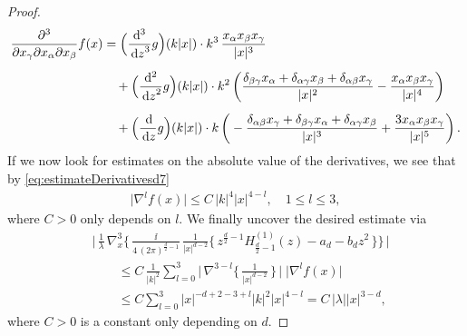 \begin{proof}
\begin{align*}
  \frac{\partial^3}{\partial x_\gamma \partial x_\alpha \partial x_\beta} f(x)
  &= \Big(\frac{\mathrm{d}^3}{\, {\operatorname{d}\!{z}}^3}g\Big)(k |x|) \cdot k^3 \,\frac{x_\alpha x_\beta x_\gamma}{|x|^3} \\[0.5em]
  &\quad + \Big(\frac{\mathrm{d}^2}{\, {\operatorname{d}\!{z}}^2}g\Big)(k|x|) 
  \cdot k^2\, \bigg( \frac{\delta_{\beta\gamma} x_\alpha + \delta_{\alpha\gamma} x_\beta + \delta_{\alpha\beta} x_\gamma }{|x|^2} 
  - \frac{x_\alpha x_\beta x_\gamma}{|x|^4} \bigg) \\[0.5em]
  &\quad + \Big(\frac{\, {\operatorname{d}\!{}}}{\, {\operatorname{d}\!{z}}}g\Big)(k|x|) \cdot k\, \bigg(-\frac{ \delta_{\alpha\beta}x_\gamma + \delta_{\beta\gamma}x_\alpha  + \delta_{\alpha\gamma}x_\beta }{|x|^3} + \frac{3 x_\alpha x_\beta x_\gamma}{|x|^5} \bigg)\,.
\end{align*}
If we now look for estimates on the absolute value of the derivatives, we see that by \eqref{eq:estimateDerivativesd7}
\begin{align*}
  \big|\nabla^l f(x)\big| \leq C \, |k|^4 |x|^{4 - l}, \quad 1 \leq l \leq 3,
\end{align*}
where $C > 0$ only depends on $l$.
We finally uncover the desired estimate via
\begin{align*}
  &\bigg|\, 
  \frac{1}{\lambda} \, \nabla_x^3
  \Bigg\{ \, \frac{\ii}{4\, (2\pi)^{\frac{d}{2} - 1}}\, \frac{1}{|x|^{d - 2}} 
  \Big\{ \,z^{\frac{d}{2} - 1} H_{\frac{d}{2} - 1}^{(1)}(z) - a_d - b_d z^2 \,
  \Big\} 
  \Bigg\} \,
  \bigg| \\[0.5em]
  &\qquad\leq C\, 
  \frac{1}{|k|^2} \sum_{l = 0}^3 \bigg| \, \nabla^{3 - l} \bigg\{\, \frac{1}{|x|^{d - 2}}\, \bigg\} \, \bigg|
  \; \big| \nabla^l f(x) \big| \\[0.5em]
  &\qquad\leq C \sum_{l = 0}^3 |x|^{-d + 2 - 3 + l} |k|^2 |x|^{4 - l} = C\, |\lambda| |x|^{3 - d},
\end{align*}
where $C > 0$ is a constant only depending on $d$.


\end{proof}
